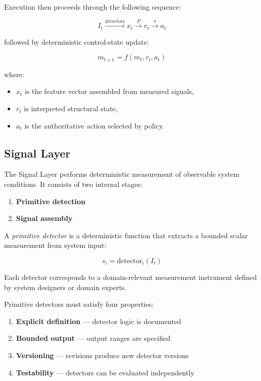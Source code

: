 \documentclass[11pt]{article}
\begin{document}
Execution then proceeds through the following sequence:

\[
I_t \xrightarrow{\text{detectors}} x_t \xrightarrow{P} r_t \xrightarrow{\pi} a_t
\]

followed by deterministic control-state update:

\[
m_{t+1} = f(m_t, r_t, a_t)
\]

where:

\begin{itemize}
  \item $x_t$ is the feature vector assembled from measured signals,
  \item $r_t$ is interpreted structural state,
  \item $a_t$ is the authoritative action selected by policy.
\end{itemize}

\subsection{Signal Layer}

The Signal Layer performs deterministic measurement of observable system conditions. It consists of two internal stages:

\begin{enumerate}
  \item \textbf{Primitive detection}
  \item \textbf{Signal assembly}
\end{enumerate}

A \emph{primitive detector} is a deterministic function that extracts a bounded scalar measurement from system input:

\[
s_i = \mathrm{detector}_i(I_t)
\]

Each detector corresponds to a domain-relevant measurement instrument defined by system designers or domain experts.

Primitive detectors must satisfy four properties:

\begin{enumerate}
  \item \textbf{Explicit definition} — detector logic is documented
  \item \textbf{Bounded output} — output ranges are specified
  \item \textbf{Versioning} — revisions produce new detector versions
  \item \textbf{Testability} — detectors can be evaluated independently
\end{enumerate}
\end{document}

